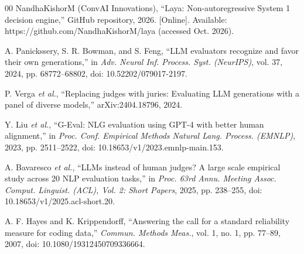 \begin{thebibliography}{00}
 NandhaKishorM (ConvAI Innovations), ``Laya: Non-autoregressive System 1 decision engine,'' GitHub repository, 2026. [Online]. Available: https://github.com/NandhaKishorM/laya (accessed Oct. 2026).


 A. Panickssery, S. R. Bowman, and S. Feng, ``LLM evaluators recognize and favor their own generations,'' in \emph{Adv. Neural Inf. Process. Syst. (NeurIPS)}, vol. 37, 2024, pp. 68772--68802, doi: 10.52202/079017-2197.

 P. Verga \emph{et al.}, ``Replacing judges with juries: Evaluating LLM generations with a panel of diverse models,'' arXiv:2404.18796, 2024.

 Y. Liu \emph{et al.}, ``G-Eval: NLG evaluation using GPT-4 with better human alignment,'' in \emph{Proc. Conf. Empirical Methods Natural Lang. Process. (EMNLP)}, 2023, pp. 2511--2522, doi: 10.18653/v1/2023.emnlp-main.153.

 A. Bavaresco \emph{et al.}, ``LLMs instead of human judges? A large scale empirical study across 20 NLP evaluation tasks,'' in \emph{Proc. 63rd Annu. Meeting Assoc. Comput. Linguist. (ACL), Vol. 2: Short Papers}, 2025, pp. 238--255, doi: 10.18653/v1/2025.acl-short.20.

 A. F. Hayes and K. Krippendorff, ``Answering the call for a standard reliability measure for coding data,'' \emph{Commun. Methods Meas.}, vol. 1, no. 1, pp. 77--89, 2007, doi: 10.1080/19312450709336664.


\end{thebibliography}
